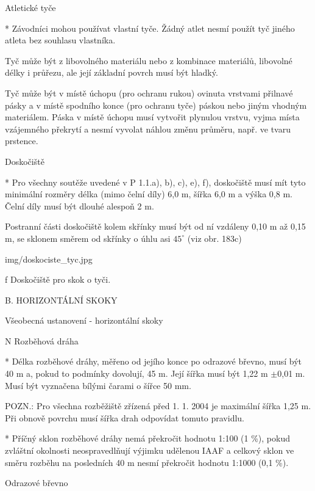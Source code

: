 Atletické tyče

* Závodníci mohou používat vlastní tyče. Žádný atlet nesmí použít tyč jiného atleta bez souhlasu vlastníka.

Tyč může být z libovolného materiálu nebo z kombinace materiálů, libovolné délky i průřezu, ale její základní povrch musí být hladký.

Tyč může být v místě úchopu (pro ochranu rukou) ovinuta vrstvami přilnavé pásky a v místě spodního konce (pro ochranu tyče) páskou nebo jiným vhodným materiálem. Páska v místě úchopu musí vytvořit plynulou vrstvu, vyjma místa vzájemného překrytí a nesmí vyvolat náhlou změnu průměru, např. ve tvaru prstence.

Doskočiště

* Pro všechny soutěže uvedené v P 1.1.a), b), c), e), f), doskočiště musí mít tyto minimální rozměry délka (mimo čelní díly) 6,0 m, šířka 6,0 m a výška 0,8 m. Čelní díly musí být dlouhé alespoň 2 m.

Postranní části doskočiště kolem skřínky musí být od ní vzdáleny 0,10 m až 0,15 m, se sklonem směrem od skřínky o úhlu asi $45^\circ$ (viz obr. 183c)

\picw=8cm \inspic img/doskociste_tyc.jpg
\caption/f Doskočiště pro skok o tyči.
\enditems


B. HORIZONTÁLNÍ SKOKY

\secc Všeobecná ustanovení - horizontální skoky

\begitems \style N
Rozběhová dráha

* Délka rozběhové dráhy, měřeno od jejího konce po odrazové břevno, musí být 40 m a, pokud to podmínky dovolují, 45 m. Její šířka musí být 1,22 m $\pm$0,01 m. Musí být vyznačena bílými čarami o šířce 50 mm.

POZN.: Pro všechna rozběžiště zřízená před 1. 1. 2004 je maximální šířka 1,25 m. Při obnově povrchu musí šířka drah odpovídat tomuto pravidlu.

* Příčný sklon rozběhové dráhy nemá překročit hodnotu 1:100 (1 \%), pokud zvláštní okolnosti neospravedlňují výjimku udělenou IAAF a celkový sklon ve směru rozběhu na posledních 40 m nesmí překročit hodnotu 1:1000 (0,1 \%).

Odrazové břevno

